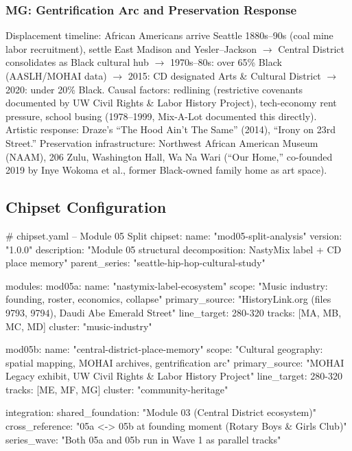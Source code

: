 \documentclass[11pt,letterpaper]{article}
\begin{document}
\subsubsection{MG: Gentrification Arc and Preservation Response}

Displacement timeline: African Americans arrive Seattle 1880s--90s (coal mine labor recruitment),
settle East Madison and Yesler--Jackson $\rightarrow$ Central District consolidates as Black cultural
hub $\rightarrow$ 1970s--80s: over 65\% Black (AASLH/MOHAI data) $\rightarrow$ 2015: CD designated
Arts \& Cultural District $\rightarrow$ 2020: under 20\% Black. Causal factors: redlining (restrictive
covenants documented by UW Civil Rights \& Labor History Project), tech-economy rent pressure,
school busing (1978--1999, Mix-A-Lot documented this directly). Artistic response: Draze's ``The
Hood Ain't The Same'' (2014), ``Irony on 23rd Street.'' Preservation infrastructure: Northwest
African American Museum (NAAM), 206 Zulu, Washington Hall, Wa Na Wari (``Our Home,'' co-founded
2019 by Inye Wokoma et al., former Black-owned family home as art space).

\subsection{Chipset Configuration}

\begin{asciibox}
# chipset.yaml -- Module 05 Split
chipset:
  name: "mod05-split-analysis"
  version: "1.0.0"
  description: "Module 05 structural decomposition: NastyMix label + CD place memory"
  parent_series: "seattle-hip-hop-cultural-study"

modules:
  mod05a:
    name: "nastymix-label-ecosystem"
    scope: "Music industry: founding, roster, economics, collapse"
    primary_source: "HistoryLink.org (files 9793, 9794), Daudi Abe Emerald Street"
    line_target: 280-320
    tracks: [MA, MB, MC, MD]
    cluster: "music-industry"

  mod05b:
    name: "central-district-place-memory"
    scope: "Cultural geography: spatial mapping, MOHAI archives, gentrification arc"
    primary_source: "MOHAI Legacy exhibit, UW Civil Rights & Labor History Project"
    line_target: 280-320
    tracks: [ME, MF, MG]
    cluster: "community-heritage"

integration:
  shared_foundation: "Module 03 (Central District ecosystem)"
  cross_reference: "05a <-> 05b at founding moment (Rotary Boys & Girls Club)"
  series_wave: "Both 05a and 05b run in Wave 1 as parallel tracks"
\end{asciibox}
\end{document}
